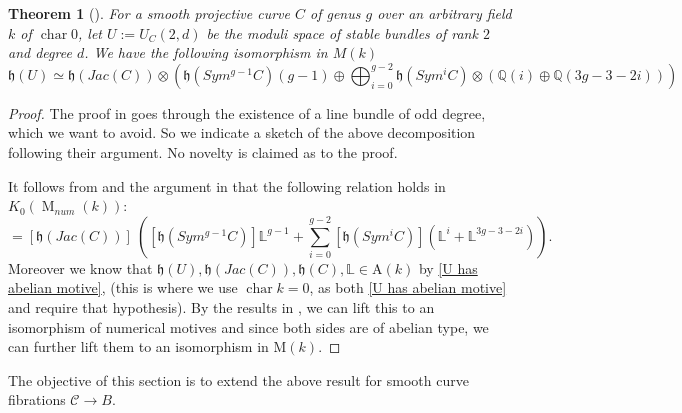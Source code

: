\documentclass[11pt]{amsart}
\newtheorem{theorem}{Theorem}[section]
\theoremstyle{definition}
\begin{document}
 \begin{theorem}[\cite{hoskins}]\label{HoskinsMotivDecomp}
 For a smooth projective curve $C$ of genus $g$ over an arbitrary field $k$ of $\operatorname{char} 0$, let $U:= U_C(2,d)$ be the moduli space of stable bundles of rank $2$ and degree $d$. We have the following isomorphism in $M(k)$ 
     \begin{equation*}
         \mathfrak h(U) \simeq \mathfrak h(Jac (C)) \otimes \left (\mathfrak h (Sym^{g-1} C)(g-1) \oplus  \bigoplus_{i=0}^{g-2} \mathfrak h(Sym^i C) \otimes (\mathbb Q(i) \oplus \mathbb Q(3g-3-2i) ) \right )
     \end{equation*}
 \end{theorem}
\begin{proof} The proof in \cite{hoskins} goes through the existence of a line bundle of odd degree, which we want to avoid. So we indicate a sketch of the above decomposition following their argument. No novelty is claimed as to the proof.

\noindent It follows from \cite[Theorem 4.11]{del-bano} and the argument in \cite[Theorem 4.3]{hoskins} that the following relation holds in $K_0 (\operatorname{\mathrm M}_{num}(k))$: \begin{equation*}
    [\mathfrak h(U)] = [\mathfrak h(Jac(C))] \ \left ( [\mathfrak h(Sym^{g-1}C)]\mathbb L^{g-1} +\sum_{i=0}^{g-2} [\mathfrak h(Sym^i C) ] \left ( \mathbb L^i +\mathbb L^{3g-3-2i} \right )\right ). 
\end{equation*}
Moreover we know that $\mathfrak h(U) , \mathfrak h(Jac(C)) , \mathfrak h( C) ,\mathbb L \in \mathrm A(k)$ by \ref{U has abelian motive},  \cite[Theorem 4.5]{del-bano} (this is where we use $\operatorname{char} k=0$, as both \ref{U has abelian motive} and \cite[Theorem 4.5]{del-bano} require that hypothesis).  By the results in \cite{MR1150598}, we can lift this to an isomorphism of numerical motives and since both sides are of abelian type, we can further lift them to an isomorphism in $\mathrm M(k)$.    
\end{proof}
The objective of this section is to extend the above result for smooth curve fibrations $\mathcal C\rightarrow B$. 
\end{document}
